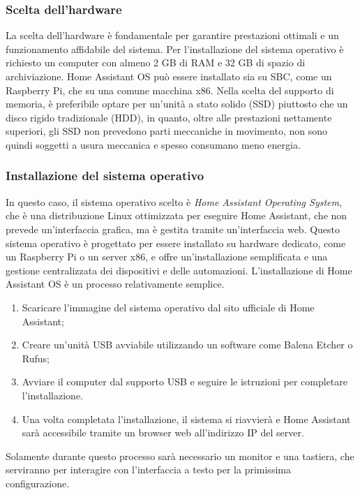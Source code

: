 \documentclass[11pt, a4paper]{article}
\begin{document}
\subsubsection{Scelta dell'hardware}
La scelta dell'hardware è fondamentale per garantire prestazioni ottimali e un funzionamento affidabile del sistema.
Per l'installazione del sistema operativo è richiesto un computer con almeno 2 GB di RAM e 32 GB di spazio di archiviazione.
Home Assistant OS può essere installato sia su SBC, come un Raspberry Pi, che su una comune macchina x86.
Nella scelta del supporto di memoria, è preferibile optare per un'unità a stato solido (SSD) piuttosto che un disco rigido tradizionale (HDD),
in quanto, oltre alle prestazioni nettamente superiori, gli SSD non prevedono parti meccaniche in movimento, non sono quindi
soggetti a usura meccanica e spesso consumano meno energia.

\subsubsection{Installazione del sistema operativo}
In questo caso, il sistema operativo scelto è \textit{Home Assistant Operating System}, che è una distribuzione Linux
ottimizzata per eseguire Home Assistant, che non prevede un'interfaccia grafica, ma è gestita tramite un'interfaccia web.
Questo sistema operativo è progettato per essere installato su hardware dedicato, come un Raspberry Pi o un server x86, 
e offre un'installazione semplificata e una gestione centralizzata dei dispositivi e delle automazioni.
L'installazione di Home Assistant OS è un processo relativamente semplice.
\begin{enumerate}
    \item Scaricare l'immagine del sistema operativo dal sito ufficiale di Home Assistant;
    \item Creare un'unità USB avviabile utilizzando un software come Balena Etcher o Rufus;
    \item Avviare il computer dal supporto USB e seguire le istruzioni per completare l'installazione.
    \item Una volta completata l'installazione, il sistema si riavvierà e Home Assistant sarà accessibile tramite un browser web all'indirizzo IP del server.
\end{enumerate}

Solamente durante questo processo sarà necessario un monitor e una tastiera, che serviranno per interagire con l'interfaccia
a testo per la primissima configurazione.
\end{document}
